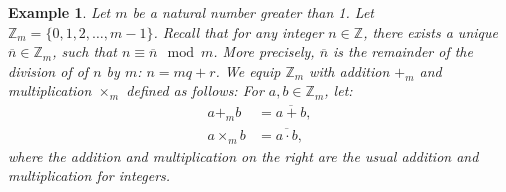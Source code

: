 \documentclass[a4paper,12pt]{report}
\newcommand{\ol}[1]{\overline{#1}}
\newcounter{statement}
\numberwithin{statement}{chapter}
\newtheorem{eg}[statement]{\bf Example}
\numberwithin{equation}{chapter}
\numberwithin{section}{chapter}
\numberwithin{subsection}{section}
\begin{document}
\begin{eg}
Let $m$ be a natural number greater than 1.  Let $\mathbb{Z}_m = \{0, 1, 2, \ldots, m - 1\}$.
Recall that for any integer $n \in \mathbb{Z}$, there exists a unique $\ol{n} \in \mathbb{Z}_m$,
such that $n \equiv \ol{n} \mod m$.  More precisely, $\ol{n}$ is the remainder of the division of of $n$ by $m$:
$n = mq + r$.
We equip $\mathbb{Z}_m$ with addition $+_m$ and multiplication $\times_m$ defined as follows:
For $a, b \in \mathbb{Z}_m$, let:
\[
\begin{split}
a +_m b &= \overline{a + b},\\
a \times_m b &= \overline{a\cdot b},
\end{split}
\]
where the addition and multiplication on the right are the usual addition and multiplication for integers.
\end{eg}
\end{document}
